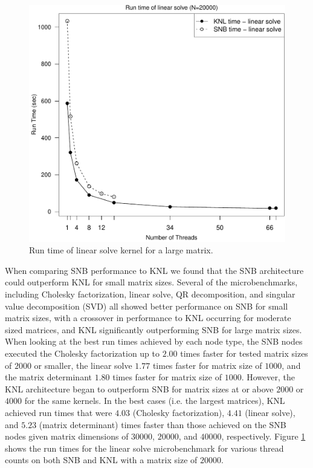 \begin{figure}
\includegraphics[height=\columnwidth, width=\columnwidth]{linsolve_20000_68-rt.pdf}
\caption{Run time of linear solve kernel for a large matrix.}
\label{fig:largeLinsolveTime}
\end{figure}

When comparing SNB performance to KNL we found that the SNB architecture could outperform
KNL for small matrix sizes. Several of the microbenchmarks, including Cholesky
factorization, linear solve, QR decomposition, and singular value decomposition (SVD) all
showed better performance on SNB for small matrix sizes, with a crossover in performance
to KNL occurring for moderate sized matrices, and KNL significantly outperforming SNB for
large matrix sizes. When looking at the best run times achieved by each node type, the SNB
nodes executed the Cholesky factorization up to $2.00$ times faster for tested matrix
sizes of $2000$ or smaller, the linear solve $1.77$ times faster for matrix size of
$1000$, and the matrix determinant $1.80$ times faster for matrix size of $1000$. However,
the KNL architecture began to outperform SNB for matrix sizes at or above $2000$ or $4000$
for the same kernels. In the best cases (i.e. the largest matrices), KNL achieved run
times that were $4.03$ (Cholesky factorization), $4.41$ (linear solve), and $5.23$ (matrix
determinant) times faster than those achieved on the SNB nodes given matrix dimensions of
$30000$, $20000$, and $40000$, respectively. Figure \ref{fig:largeLinsolveTime} shows the
run times for the linear solve microbenchmark for various thread counts on both SNB and
KNL with a matrix size of $20000$.

